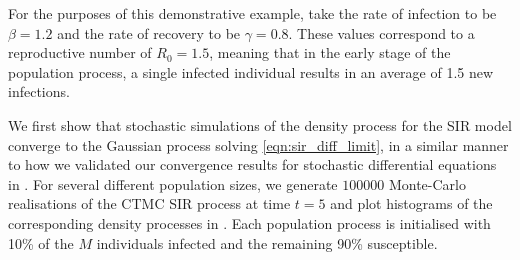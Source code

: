For the purposes of this demonstrative example, take the rate of infection to be \(\beta = 1.2\) and the rate of recovery to be \(\gamma = 0.8\).
These values correspond to a reproductive number of \(R_0 = 1.5\), meaning that in the early stage of the population process, a single infected individual results in an average of 1.5 new infections.

We first show that stochastic simulations of the density process for the SIR model converge to the Gaussian process solving \cref{eqn:sir_diff_limit}, in a similar manner to how we validated our convergence results for stochastic differential equations in .
For several different population sizes, we generate \(100000\) Monte-Carlo realisations of the CTMC SIR process at time \(t = 5\) and plot histograms of the corresponding density processes in .
Each population process is initialised with 10\% of the \(M\) individuals infected and the remaining 90\% susceptible.


